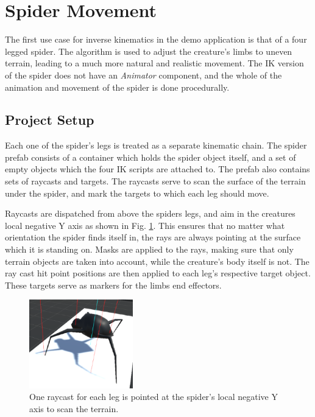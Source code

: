 \section{Spider Movement}
The first use case for inverse kinematics in the demo application is that of
a four legged spider. The algorithm is used to adjust the creature's limbs to
uneven terrain, leading to a much more natural and realistic movement. The IK
version of the spider does not have an \textit{Animator} component, and the whole of the
animation and movement of the spider is done procedurally.
\subsection{Project Setup}
Each one of the spider's legs is treated as a separate kinematic chain. The
spider prefab consists of a container which holds the spider object itself, and
a set of empty objects which the four IK scripts are attached to. The prefab
also contains sets of raycasts and targets. The raycasts serve to scan the
surface of the terrain under the spider, and mark the targets to which each leg
should move.

Raycasts are dispatched from above the spiders legs, and aim in the creatures
local negative Y axis as shown in Fig. \ref{fig:ray_casts_intro}. This ensures
that no matter what orientation the spider finds itself in, the rays are always
pointing at the surface which it is standing on. Masks are applied to the rays,
making sure that only terrain objects are taken into account, while the
creature's body itself is not. The ray cast hit point positions are then applied
to each leg's respective target object. These targets serve as markers for the
limbs end effectors. 

\begin{figure}
    \centering
    \includegraphics[width=0.4\textwidth]{grafika/sp_ik_flat.eps}
    \caption{One raycast for each leg is pointed at the spider's local negative
    Y axis to scan the terrain.}
    \label{fig:ray_casts_intro}
\end{figure}


